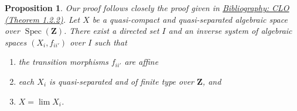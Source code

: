 \documentclass{amsart}
\newenvironment{reference}{\comment}{\endcomment}
\theoremstyle{plain}
\newtheorem{proposition}[subsection]{Proposition}
\theoremstyle{definition}
\theoremstyle{remark}
\numberwithin{equation}{subsection}
\def\lim{\mathop{\mathrm{lim}}\nolimits}
\def\Spec{\mathop{\mathrm{Spec}}}
\begin{document}
\begin{proposition}
\label{proposition-approximate}
\begin{reference}
Our proof follows closely the proof given in \href{https://stacks.math.columbia.edu/bibliography}{Bibliography: CLO (Theorem 1.2.2)}.
\end{reference}
Let $X$ be a quasi-compact and quasi-separated algebraic space over
$\Spec(\mathbf{Z})$. There exist a directed set $I$
and an inverse system of algebraic spaces $(X_i, f_{ii'})$ over $I$
such that
\begin{enumerate}
\item the transition morphisms $f_{ii'}$ are affine
\item each $X_i$ is quasi-separated and of finite type over
$\mathbf{Z}$, and
\item $X = \lim X_i$.
\end{enumerate}
\end{proposition}
\end{document}
